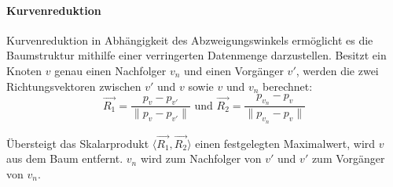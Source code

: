 \paragraph{Kurvenreduktion}
 
Kurvenreduktion in Abhängigkeit des Abzweigungswinkels ermöglicht es die Baumstruktur mithilfe einer verringerten Datenmenge darzustellen. Besitzt ein Knoten $v$ genau einen Nachfolger $v_n$ und einen Vorgänger $v'$, werden die zwei Richtungsvektoren zwischen $v'$ und $v$ sowie $v$ und $v_n$ berechnet:
\begin{equation}
\overrightarrow{R_1} = \dfrac{p_v - p_{v'}}{\lVert p_v - p_{v'} \rVert} \text{ und } \overrightarrow{R_2} = \dfrac{p_{v_n} - p_{v}}{\lVert p_{v_n} - p_{v} \rVert}
\end{equation}

Übersteigt das Skalarprodukt $\langle \overrightarrow{R_1}, \overrightarrow{R_2} \rangle$ einen festgelegten Maximalwert, wird $v$ aus dem Baum entfernt. $v_n$ wird zum Nachfolger von $v'$ und $v'$ zum Vorgänger von $v_n$. 